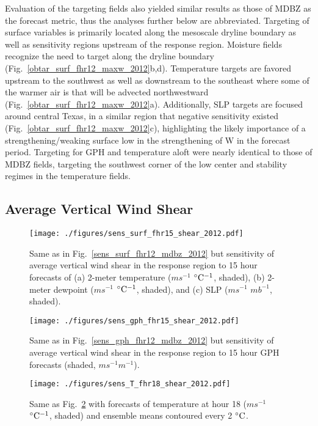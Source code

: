 \documentclass{ttuthes2007}
\newcommand{\tab}{\hspace*{2em}}  %
\begin{document}
\tab Evaluation of the targeting fields also yielded similar results as those of MDBZ as the forecast metric, thus the analyses further below are abbreviated. Targeting of surface variables is primarily located along the mesoscale dryline boundary as well as sensitivity regions upstream of the response region. Moisture fields recognize the need to target along the dryline boundary (Fig.~\ref{obtar_surf_fhr12_maxw_2012}b,d). Temperature targets are favored upstream to the southwest as well as downstream to the southeast where some of the warmer air is that will be advected northwestward (Fig.~\ref{obtar_surf_fhr12_maxw_2012}a). Additionally, SLP targets are focused around central Texas, in a similar region that negative sensitivity existed (Fig.~\ref{obtar_surf_fhr12_maxw_2012}c), highlighting the likely importance of a strengthening/weaking surface low in the strengthening of W in the forecast period. Targeting for GPH and temperature aloft were nearly identical to those of MDBZ fields, targeting the southwest corner of the low center and stability regimes in the temperature fields. 

\subsection{Average Vertical Wind Shear}

\begin{figure}[!tb]
  \centering
  \noindent\texttt{[image: ./figures/sens\_surf\_fhr15\_shear\_2012.pdf]}\\
  \caption{Same as in Fig.~\ref{sens_surf_fhr12_mdbz_2012} but sensitivity of average vertical wind shear in the response region to 15 hour forecasts of (a) 2-meter temperature ($ms^{-1}$ ${}^{\circ} {\rm C^{-1}}$, shaded), (b) 2-meter dewpoint ($ms^{-1}$ ${}^{\circ} {\rm C^{-1}}$, shaded), and (c) SLP ($ms^{-1}$ $mb^{-1}$, shaded).}
\label{sens_surf_fhr15_shear_2012}
\end{figure}

\begin{figure}[!tb]
  \centering
  \noindent\texttt{[image: ./figures/sens\_gph\_fhr15\_shear\_2012.pdf]}\\
  \caption{Same as in Fig.~\ref{sens_gph_fhr12_mdbz_2012} but sensitivity of average vertical wind shear in the response region to 15 hour GPH forecasts (shaded, $m s^{-1} m^{-1}$).}
\label{sens_gph_fhr15_shear_2012}
\end{figure}

\begin{figure}[!tb]
  \centering
  \noindent\texttt{[image: ./figures/sens\_T\_fhr18\_shear\_2012.pdf]}\\
  \caption{Same as Fig.~\ref{sens_gph_fhr15_shear_2012} with forecasts of temperature at hour 18 ($m s^{-1}$ ${}^{\circ} {\rm C^{-1}}$, shaded) and ensemble means contoured every 2 ${}^{\circ} {\rm C}$.}
\label{sens_T_fhr18_shear_2012}
\end{figure}
\end{document}
